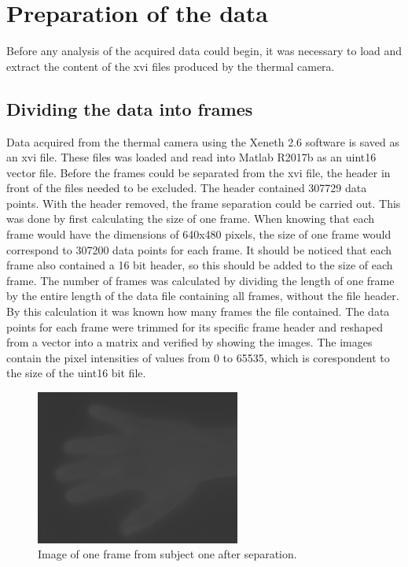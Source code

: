 \chapter{Preparation of the data}

Before any analysis of the acquired data could begin, it was necessary to load and extract the content of the xvi files produced by the thermal camera.  

\section{Dividing the data into frames}

Data acquired from the thermal camera using the Xeneth 2.6 software is saved as an xvi file. These files was loaded and read into Matlab R2017b as an uint16 vector file. Before the frames could be separated from the xvi file, the header in front of the files needed to be excluded. The header contained 307729 data points. With the header removed, the frame separation could be carried out. This was done by first calculating the size of one frame. When knowing that each frame would have the dimensions of 640x480 pixels, the size of one frame would correspond to 307200 data points for each frame. It should be noticed that each frame also contained a 16 bit header, so this should be added to the size of each frame. The number of frames was calculated by dividing the length of one frame by the entire length of the data file containing all frames, without the file header. By this calculation it was known how many frames the file contained. The data points for each frame were trimmed for its specific frame header and reshaped from a vector into a matrix and verified by showing the images. 
The images contain the pixel intensities of values from 0 to 65535, which is corespondent to the size of the uint16 bit file. 


\begin{figure}[H]
	\includegraphics[width=0.6\textwidth]{figures/uint16Hand}  %
	\caption{Image of one frame from subject one after separation.}
	\label{fig:hand}  %
\end{figure}